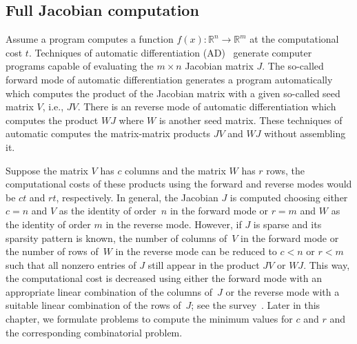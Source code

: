 \documentclass[12pt, twoside,a4paper,toc=bibliography]{scrbook}
\newcommand{\setR}{\ensuremath{\mathbb{R}}}
\newcommand{\col}{\ensuremath{c}}
\newcommand{\row}{\ensuremath{r}}
\begin{document}
\subsection{Full Jacobian computation}
\label{s.full.jac}
Assume a program computes a function $f(x) : \setR^n \rightarrow \setR^m$
at the computational cost $t$.
Techniques of automatic differentiation (AD)~\cite{Griewank2008EDP,Rall1981ADT} generate
computer programs capable of evaluating the $m \times n$ Jacobian matrix $J$.
The so-called forward mode of automatic differentiation generates a program automatically
which computes the product of the Jacobian matrix with a given so-called seed matrix $V$,
i.e., $JV$. There is an reverse mode of automatic differentiation which computes the product $WJ$
where $W$ is another seed matrix.
These techniques of automatic computes the matrix-matrix products $JV$ and $WJ$
without assembling it.

Suppose the matrix $V$ has $\col$ columns and the matrix $W$ has $\row$ rows,
the computational costs of these products using the forward and reverse modes
would be $\col t$ and $\row t$, respectively.
In general, the Jacobian $J$ is computed choosing either $c=n$ and $V$ as the identity of
order~$n$ in the forward mode or $r = m$ and $W$ as the identity of order $m$ in the
reverse mode. However, if $J$ is sparse and its sparsity pattern is known, the number of
columns of~$V$ in the forward mode or the number of rows of~$W$ in the reverse mode can
be reduced to $\col < n$ or $\row < m$ such that all nonzero entries of $J$ still appear
in the product $JV$ or $WJ$. This way, the computational cost is decreased using either
the forward mode with an appropriate linear combination of the columns of~$J$ or the reverse
mode with a suitable linear combination of the rows of~$J$; see the
survey~\cite{Gebremedhin05whatcolor}.
Later in this chapter, we formulate problems to compute the
minimum values for $\col$ and $\row$ and the corresponding combinatorial problem.
\end{document}
